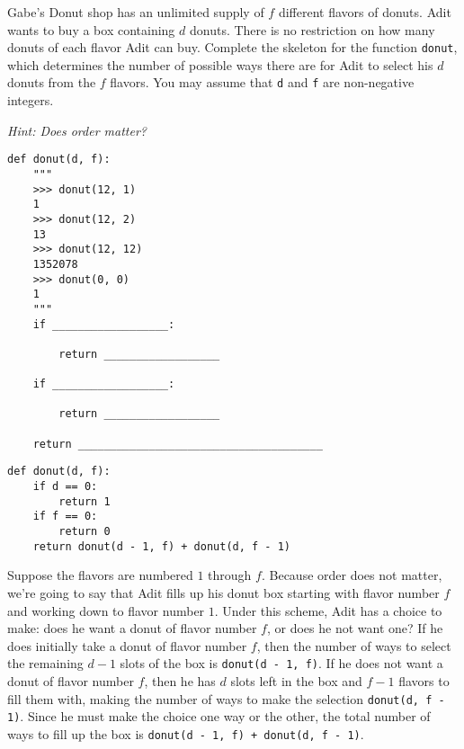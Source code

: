 \begin{blocksection}
\question Gabe's Donut shop has an unlimited supply of $f$ different flavors of donuts. Adit wants to buy a box containing $d$ donuts. 
There is no restriction on how many donuts of each flavor Adit can buy. 
Complete the skeleton for the function \lstinline{donut}, which determines the number of possible ways there are for Adit to select his
 $d$ donuts from the $f$ flavors. You may assume that \lstinline{d} and \lstinline{f} are non-negative integers. 

\textit{Hint: Does order matter?}

\begin{lstlisting}
def donut(d, f):
    """
    >>> donut(12, 1)
    1
    >>> donut(12, 2)
    13
    >>> donut(12, 12)
    1352078
    >>> donut(0, 0)
    1
    """
    if __________________:

        return __________________

    if __________________:

        return __________________

    return ______________________________________
\end{lstlisting}

\begin{solution}[0in]
\begin{lstlisting}
def donut(d, f):
    if d == 0:
        return 1
    if f == 0:
        return 0
    return donut(d - 1, f) + donut(d, f - 1)
\end{lstlisting}

Suppose the flavors are numbered $1$ through $f$. Because order does not matter, we're going to say that Adit fills up his donut box starting with flavor number $f$ and working down to flavor number $1$. Under this scheme, Adit has a choice to make: does he want a donut of flavor number $f$, or does he not want one? If he does initially take a donut of flavor number $f$, then the number of ways to select the remaining $d - 1$ slots of the box is \lstinline{donut(d - 1, f)}. If he does not want a donut of flavor number $f$, then he has $d$ slots left in the box and $f - 1$ flavors to fill them with, making the number of ways to make the selection \lstinline{donut(d, f - 1)}. Since he must make the choice one way or the other, the total number of ways to fill up the box is \lstinline{donut(d - 1, f) + donut(d, f - 1)}. 
\end{solution}
\end{blocksection}


